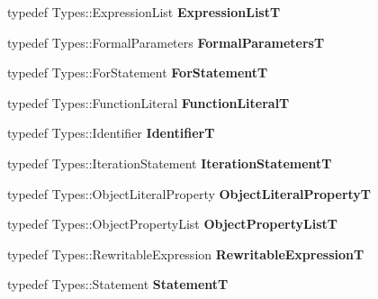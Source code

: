 \begin{DoxyCompactItemize}
typedef Types\+::\+Expression\+List {\bfseries Expression\+ListT}
\item 
\mbox{\label{classv8_1_1internal_1_1ParserBase_ae1f7be64542afd046ddc8334939ed63d}} 
typedef Types\+::\+Formal\+Parameters {\bfseries Formal\+ParametersT}
\item 
\mbox{\label{classv8_1_1internal_1_1ParserBase_a07639d0b86bf960fa714fa65c923ceaf}} 
typedef Types\+::\+For\+Statement {\bfseries For\+StatementT}
\item 
\mbox{\label{classv8_1_1internal_1_1ParserBase_a53dcd5c9e4b085a8c0631b47cc7e40b7}} 
typedef Types\+::\+Function\+Literal {\bfseries Function\+LiteralT}
\item 
\mbox{\label{classv8_1_1internal_1_1ParserBase_a05fb3744e71e1d82e222862d71e9152a}} 
typedef Types\+::\+Identifier {\bfseries IdentifierT}
\item 
\mbox{\label{classv8_1_1internal_1_1ParserBase_a6f2d97bd6133044e9a01b1756c2918e5}} 
typedef Types\+::\+Iteration\+Statement {\bfseries Iteration\+StatementT}
\item 
\mbox{\label{classv8_1_1internal_1_1ParserBase_ada30790f6f3169968c9d31b0076451d3}} 
typedef Types\+::\+Object\+Literal\+Property {\bfseries Object\+Literal\+PropertyT}
\item 
\mbox{\label{classv8_1_1internal_1_1ParserBase_a6c44a539d7a1c8e32019ef1e52e87a45}} 
typedef Types\+::\+Object\+Property\+List {\bfseries Object\+Property\+ListT}
\item 
\mbox{\label{classv8_1_1internal_1_1ParserBase_a2982ac2243da52a91d92cb55b0db74f3}} 
typedef Types\+::\+Rewritable\+Expression {\bfseries Rewritable\+ExpressionT}
\item 
\mbox{\label{classv8_1_1internal_1_1ParserBase_ab518112cd5e77e379b0f3c77646a4113}} 
typedef Types\+::\+Statement {\bfseries StatementT}
\item 

\end{DoxyCompactItemize}

